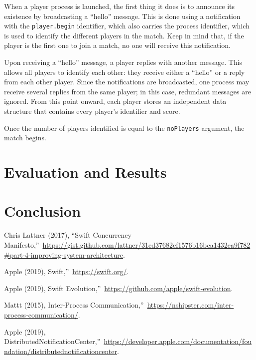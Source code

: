 \documentclass[11pt]{article}
\begin{document}
When a player process is launched, the first thing it does is to announce its existence by broadcasting a ``hello'' message.
This is done using a notification with the \texttt{player.begin} identifier, which also carries the process identifier, which is used to identify the different players in the match.
Keep in mind that, if the player is the first one to join a match, no one will receive this notification.

Upon receiving a ``hello'' message, a player replies with another message.
This allows all players to identify each other: they receive either a ``hello'' or a reply from each other player.
Since the notifications are broadcasted, one process may receive several replies from the same player; in this case, redundant messages are ignored.
From this point onward, each player stores an independent data structure that contains every player's identifier and score.

Once the number of players identified is equal to the \texttt{noPlayers} argument, the match begins.

\section{Evaluation and Results}

\section{Conclusion}

\begin{thebibliography}{99}
 

 Chris Lattner (2017), \textquotedblleft Swift Concurrency Manifesto,\textquotedblright\ \url{https://gist.github.com/lattner/31ed37682ef1576b16bca1432ea9f782#part-4-improving-system-architecture}.

 Apple (2019), Swift,\textquotedblright\ \url{https://swift.org/}.

 Apple (2019), Swift Evolution,\textquotedblright\ \url{https://github.com/apple/swift-evolution}.

 Mattt (2015), Inter-Process Communication,\textquotedblright\ \url{https://nshipster.com/inter-process-communication/}.

 Apple (2019), DistributedNotificationCenter,\textquotedblright\ \url{https://developer.apple.com/documentation/foundation/distributednotificationcenter}.


\end{thebibliography}
\end{document}
